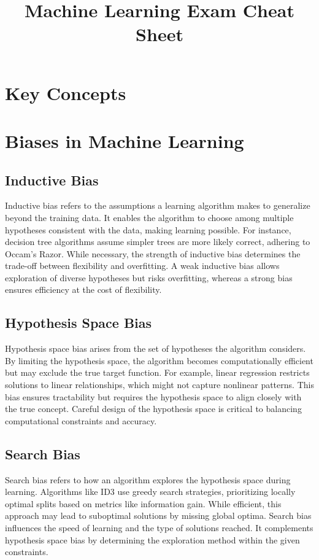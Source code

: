 \documentclass[10pt,a4paper]{article}
\title{Machine Learning Exam Cheat Sheet}
\author{}
\date{}
\begin{document}
\maketitle

\section*{Key Concepts}
\section*{Biases in Machine Learning}

\subsection*{Inductive Bias}
Inductive bias refers to the assumptions a learning algorithm makes to generalize beyond the training data. It enables the algorithm to choose among multiple hypotheses consistent with the data, making learning possible. For instance, decision tree algorithms assume simpler trees are more likely correct, adhering to Occam's Razor. While necessary, the strength of inductive bias determines the trade-off between flexibility and overfitting. A weak inductive bias allows exploration of diverse hypotheses but risks overfitting, whereas a strong bias ensures efficiency at the cost of flexibility.

\subsection*{Hypothesis Space Bias}
Hypothesis space bias arises from the set of hypotheses the algorithm considers. By limiting the hypothesis space, the algorithm becomes computationally efficient but may exclude the true target function. For example, linear regression restricts solutions to linear relationships, which might not capture nonlinear patterns. This bias ensures tractability but requires the hypothesis space to align closely with the true concept. Careful design of the hypothesis space is critical to balancing computational constraints and accuracy.

\subsection*{Search Bias}
Search bias refers to how an algorithm explores the hypothesis space during learning. Algorithms like ID3 use greedy search strategies, prioritizing locally optimal splits based on metrics like information gain. While efficient, this approach may lead to suboptimal solutions by missing global optima. Search bias influences the speed of learning and the type of solutions reached. It complements hypothesis space bias by determining the exploration method within the given constraints.
\end{document}

